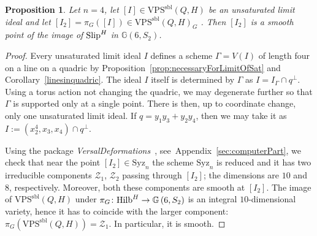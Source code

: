 \documentclass{amsart}
\newcommand{\Hilb}{{\rm{Hilb}}}
\newcommand{\Slip}{{\rm{Slip}}}
\def\Gr #1#2{{\mathbb G}\left(#1,#2\right)} %
\newcommand{\VPSsbl}{{\mathrm{VPS}}^{\mathrm{sbl}}(Q, H)}
\newcommand{\Syz}{\mathrm{Syz}_n}%
\newtheorem{proposition}[lemma]{\bf Proposition}
\begin{document}
\begin{proposition}\label{prop:GrassSlipSmooth}
    Let $n=4$, let $[I]\in \VPSsbl$ be an unsaturated limit ideal and let $[I_2]=\pi_G([I])\in \VPSsbl_G$ . Then $[I_2]$ is a smooth
    point of the image of $\Slip^H$ in $\Gr{6}{S_2}$.
\end{proposition}
\begin{proof}
    Every unsaturated limit ideal $I$ defines a scheme $\Gamma=V(I)$ of length four on a line on a quadric by
    Proposition~\ref{prop:necessaryForLimitOfSat} and
    Corollary~\ref{linesinquadric}. The ideal $I$ itself is determined by $\Gamma$
    as $I=I_\Gamma\cap q^\perp$.
    Using a torus action not changing the quadric, we may degenerate
    further so that $\Gamma$ is supported only at a single point.
    There is then, up to coordinate change, only one unsaturated limit ideal. If $q = y_1y_3 +
    y_2y_4$, then we may take it as $I := (x_2^4, x_3, x_4)\cap q^\perp$.

    Using the package \emph{VersalDeformations}~\cite{Ilten}, see~Appendix~\ref{sec:computerPart},
    we check that near the point $[I_2]\in \Syz$ the scheme $\Syz$ is reduced
    and it has two irreducible components $\mathcal{Z}_1$, $\mathcal{Z}_2$ passing through $[I_2]$; the
    dimensions are $10$ and $8$, respectively. Moreover, both these components
    are smooth at $[I_2]$. The image of $\VPSsbl$ under $\pi_G\colon \Hilb^H \to
    \Gr{6}{S_2}$ is an integral $10$-dimensional variety, hence it
    has to coincide with the larger component: $\pi_G(\VPSsbl) =
    \mathcal{Z}_1$. In particular, it is smooth.
\end{proof}
\end{document}
